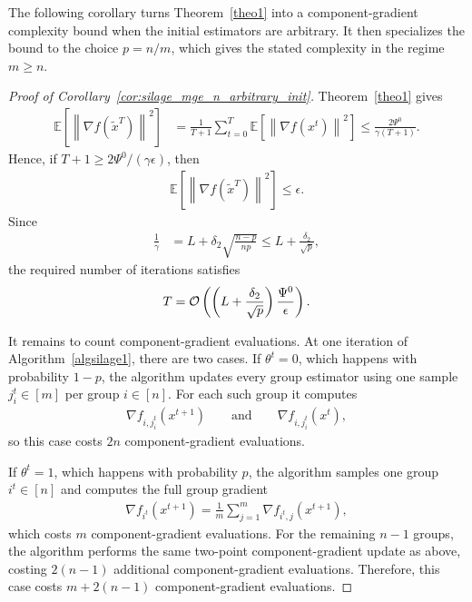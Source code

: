 \documentclass{article}
\newcommand{\bb}{\mathbb}
\newcommand{\sqn}[1]{\left\| #1 \right\|^2}
\newcommand{\nf}[1]{\nabla f\rb{#1}}
\newcommand{\cO}{{\cal O}}
\newcommand{\Exp}[1]{{\bb E}\left[#1\right]}
\newcommand{\rb}[1]{\left(#1\right)}
\newcommand {\rbl}[1]{(#1)} %
\renewcommand{\nf}[1]{\nabla f\rbl{#1}}
\theoremstyle{plain}
\begin{document}
The following corollary turns Theorem~\ref{theo1} into a component-gradient complexity bound when the initial estimators are arbitrary.
It then specializes the bound to the choice $p=n/m$, which gives the stated complexity in the regime $m\ge n$.

\silageMgeNArbitraryInit*

\begin{proof}[Proof of Corollary~\ref{cor:silage_mge_n_arbitrary_init}]
Theorem~\ref{theo1} gives
\begin{align*}
\Exp{\sqn{\nf{\tilde{x}^T}}}
&=
\frac{1}{T+1}\sum_{t=0}^{T}\Exp{\sqn{\nf{x^t}}}
\le
\frac{2\Psi^0}{\gamma(T+1)}.
\end{align*}
Hence, if $T+1\ge 2\Psi^0/(\gamma\epsilon)$, then
\begin{align*}
\Exp{\sqn{\nf{\tilde{x}^T}}}\le \epsilon.
\end{align*}
Since
\begin{align*}
\frac1\gamma
&=
L+\delta_2\sqrt{\frac{n-p}{np}}
\le
L+\frac{\delta_2}{\sqrt p},
\end{align*}
the required number of iterations satisfies
\begin{align*}
T
=
\cO\rb{
\rb{L+\frac{\delta_2}{\sqrt p}}
\frac{\Psi^0}{\epsilon}
}.
\end{align*}

It remains to count component-gradient evaluations. At one iteration of
Algorithm~\ref{algsilage1}, there are two cases. If $\theta^t=0$, which happens
with probability $1-p$, the algorithm updates every group estimator using one
sample $j_i^t\in[m]$ per group $i\in[n]$. For each such group it computes
\begin{align*}
\nabla f_{i,j_i^t}(x^{t+1})
\qquad\text{and}\qquad
\nabla f_{i,j_i^t}(x^t),
\end{align*}
so this case costs $2n$ component-gradient evaluations.

If $\theta^t=1$, which happens with probability $p$, the algorithm samples one
group $i^t\in[n]$ and computes the full group gradient
\begin{align*}
\nabla f_{i^t}(x^{t+1})
=
\frac1m\sum_{j=1}^m \nabla f_{i^t,j}(x^{t+1}),
\end{align*}
which costs $m$ component-gradient evaluations. For the remaining $n-1$ groups,
the algorithm performs the same two-point component-gradient update as above,
costing $2(n-1)$ additional component-gradient evaluations. Therefore, this
case costs $m+2(n-1)$ component-gradient evaluations.


\end{proof}
\end{document}
